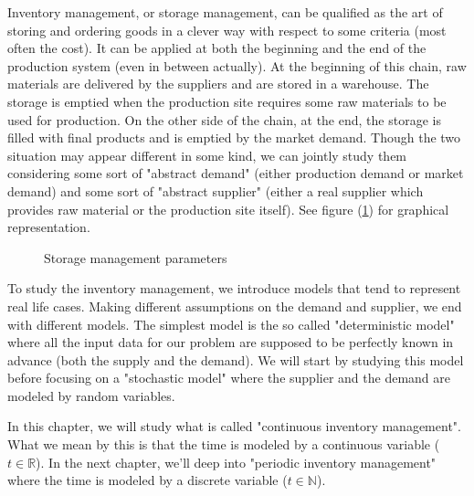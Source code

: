 Inventory management, or storage management, can be qualified as the art of storing and ordering goods in a clever way with respect to some criteria (most often the cost). It can be applied at both the beginning and the end of the production system (even in between actually). At the beginning of this chain, raw materials are delivered by the suppliers and are stored in a warehouse. The storage is emptied when the production site requires some raw materials to be used for production. On the other side of the chain, at the end, the storage is filled with final products and is emptied by the market demand. Though the two situation may appear different in some kind, we can jointly study them considering some sort of "abstract demand" (either production demand or market demand) and some sort of "abstract supplier" (either a real supplier which provides raw material or the production site itself). See figure (\ref{continuous:storage}) for graphical representation.

\begin{figure}[h!]
    \centering
    \caption{\label{continuous:storage}Storage management parameters}
\end{figure}

To study the inventory management, we introduce models that tend to represent real life cases. Making different assumptions on the demand and supplier, we end with different models. The simplest model is the so called "deterministic model" where all the input data for our problem are supposed to be perfectly known in advance (both the supply and the demand). We will start by studying this model before focusing on a "stochastic model" where the supplier and the demand are modeled by random variables. 

In this chapter, we will study what is called "continuous inventory management". What we mean by this is that the time is modeled by a continuous variable ($t\in\mathbb R$). In the next chapter, we'll deep into "periodic inventory management" where the time is modeled by a discrete variable ($t\in\mathbb N$). 

